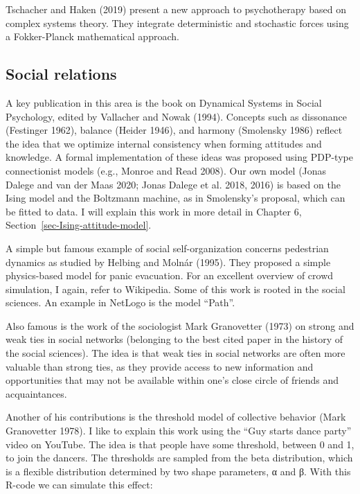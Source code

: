 \documentclass[
  a4paper,
  DIV=11,
  numbers=noendperiod,
  oneside]{scrreprt}
\begin{document}
Tschacher and Haken (2019) present a new approach to psychotherapy based
on complex systems theory. They integrate deterministic and stochastic
forces using a Fokker-Planck mathematical approach.

\hypertarget{sec-Social-relations}{%
\subsection{Social relations}\label{sec-Social-relations}}

A key publication in this area is the book on Dynamical Systems in
Social Psychology, edited by Vallacher and Nowak (1994). Concepts such
as dissonance (Festinger 1962), balance (Heider 1946), and harmony
(Smolensky 1986) reflect the idea that we optimize internal consistency
when forming attitudes and knowledge. A formal implementation of these
ideas was proposed using PDP-type connectionist models (e.g., Monroe and
Read 2008). Our own model (Jonas Dalege and van der Maas 2020; Jonas
Dalege et al. 2018, 2016) is based on the Ising model and the Boltzmann
machine, as in Smolensky's proposal, which can be fitted to data. I will
explain this work in more detail in Chapter 6,
Section~\ref{sec-Ising-attitude-model}.

A simple but famous example of social self-organization concerns
pedestrian dynamics as studied by Helbing and Molnár (1995). They
proposed a simple physics-based model for panic evacuation. For an
excellent overview of crowd simulation, I again, refer to Wikipedia.
Some of this work is rooted in the social sciences. An example in
NetLogo is the model ``Path''.

Also famous is the work of the sociologist Mark Granovetter (1973) on
strong and weak ties in social networks (belonging to the best cited
paper in the history of the social sciences). The idea is that weak ties
in social networks are often more valuable than strong ties, as they
provide access to new information and opportunities that may not be
available within one's close circle of friends and acquaintances.

Another of his contributions is the threshold model of collective
behavior (Mark Granovetter 1978). I like to explain this work using the
``Guy starts dance party'' video on YouTube. The idea is that people
have some threshold, between 0 and 1, to join the dancers. The
thresholds are sampled from the beta distribution, which is a flexible
distribution determined by two shape parameters, α and β. With this
R-code we can simulate this effect:
\end{document}

